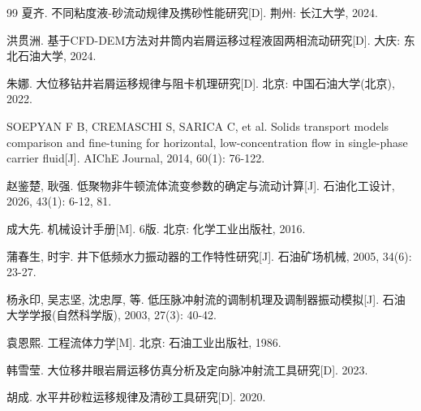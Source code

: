 \begin{thebibliography}{99}
夏齐. 不同粘度液-砂流动规律及携砂性能研究[D]. 荆州: 长江大学, 2024.

洪贯洲. 基于CFD-DEM方法对井筒内岩屑运移过程液固两相流动研究[D]. 大庆: 东北石油大学, 2024.

朱娜. 大位移钻井岩屑运移规律与阻卡机理研究[D]. 北京: 中国石油大学(北京), 2022.

SOEPYAN F B, CREMASCHI S, SARICA C, et al. Solids transport models comparison and fine-tuning for horizontal, low-concentration flow in single-phase carrier fluid[J]. AIChE Journal, 2014, 60(1): 76-122.

赵鉴楚, 耿强. 低聚物非牛顿流体流变参数的确定与流动计算[J]. 石油化工设计, 2026, 43(1): 6-12, 81.

成大先. 机械设计手册[M]. 6版. 北京: 化学工业出版社, 2016.

蒲春生, 时宇. 井下低频水力振动器的工作特性研究[J]. 石油矿场机械, 2005, 34(6): 23-27.

杨永印, 吴志坚, 沈忠厚, 等. 低压脉冲射流的调制机理及调制器振动模拟[J]. 石油大学学报(自然科学版), 2003, 27(3): 40-42.

袁恩熙. 工程流体力学[M]. 北京: 石油工业出版社, 1986.

韩雪莹. 大位移井眼岩屑运移仿真分析及定向脉冲射流工具研究[D]. 2023.

胡成. 水平井砂粒运移规律及清砂工具研究[D]. 2020.

\end{thebibliography}
